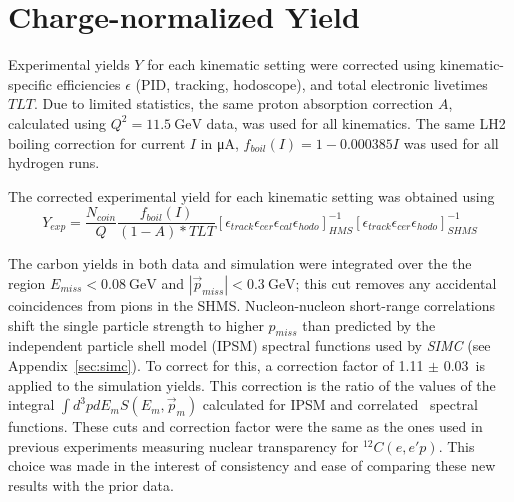 \section{Charge-normalized Yield}
Experimental yields $Y$ for each kinematic setting were corrected using
kinematic-specific efficiencies $\epsilon$
(PID, tracking, hodoscope), and
total electronic livetimes $TLT$.
Due to limited statistics, the same proton absorption correction $A$,
calculated using $Q^2=\SI{11.5}{\giga\electronvolt}$ data,
was used for all kinematics.
The same LH2 boiling correction for current $I$ in \si{\micro\ampere},
$f_{boil}(I)=1-0.000385I$
was used for all hydrogen runs.

The corrected experimental yield for each kinematic setting was obtained using
\begin{equation}
Y_{exp} = \frac{N_{coin}}{Q}
          \frac{f_{boil}(I)}{(1-A) * TLT}
          \left[
              \epsilon_{track}
              \epsilon_{cer}
              \epsilon_{cal}
              \epsilon_{hodo}
          \right]_{HMS}^{-1}
          \left[
              \epsilon_{track}
              \epsilon_{cer}
              \epsilon_{hodo}
          \right]_{SHMS}^{-1}
\end{equation}


The carbon yields in both data and simulation were integrated over
the the region
$E_{miss} < \SI{0.08}{\giga\electronvolt}$
and
$|\vec{p}_{miss}| < \SI{0.3}{\giga\electronvolt}$; this cut removes
any accidental coincidences from pions in the SHMS.
Nucleon-nucleon short-range correlations shift the single particle strength
to higher $p_{miss}$ than predicted by the independent particle shell model
(IPSM) spectral functions used by \textit{SIMC} (see Appendix~\ref{sec:simc}).
To correct for this, a correction factor of 1.11 $\pm$ 0.03\,\cite{ONeill_1995}
is applied to the simulation yields.
This correction is the ratio of the values of the integral
$\int d^3p dE_m S(E_m,\vec{p}_m)$
calculated for IPSM and correlated~\cite{VanOrden_1980} spectral functions.
These cuts and correction factor were the same as the ones used in
previous experiments measuring nuclear transparency for ${}^{12}C(e,e'p)$.
This choice was made in the interest of consistency and ease of comparing these
new results with the prior data.
